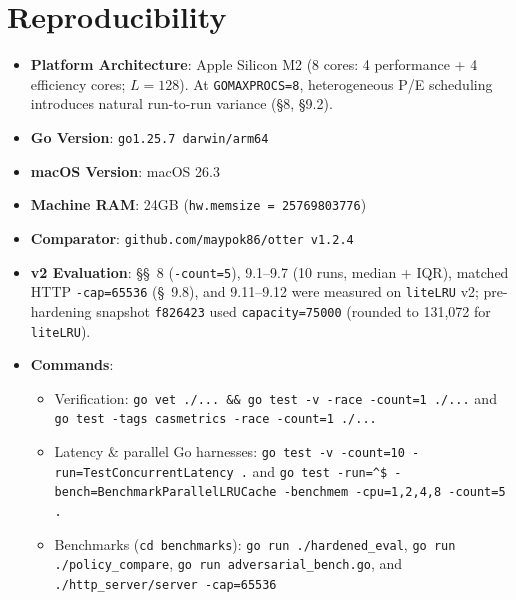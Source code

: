 \documentclass[11pt,a4paper]{article}
\begin{document}
\section{Reproducibility}
\begin{itemize}
    \item \textbf{Platform Architecture}: Apple Silicon M2 (8 cores: 4 performance + 4 efficiency cores; $L=128$). At \texttt{GOMAXPROCS=8}, heterogeneous P/E scheduling introduces natural run-to-run variance (\S 8, \S 9.2).
    \item \textbf{Go Version}: \texttt{go1.25.7 darwin/arm64}
    \item \textbf{macOS Version}: macOS 26.3
    \item \textbf{Machine RAM}: 24GB (\texttt{hw.memsize = 25769803776})
    \item \textbf{Comparator}: \texttt{github.com/maypok86/otter v1.2.4}
    \item \textbf{v2 Evaluation}: \S\S~8 (\texttt{-count=5}), 9.1--9.7 (10 runs, median + IQR), matched HTTP \texttt{-cap=65536} (\S~9.8), and 9.11--9.12 were measured on \texttt{liteLRU} v2; pre-hardening snapshot \texttt{f826423} used \texttt{capacity=75000} (rounded to 131,072 for \texttt{liteLRU}).
    \item \textbf{Commands}:
    \begin{itemize}
        \item Verification: \texttt{go vet ./... \&\& go test -v -race -count=1 ./...} and \texttt{go test -tags casmetrics -race -count=1 ./...}
        \item Latency \& parallel Go harnesses: \texttt{go test -v -count=10 -run=TestConcurrentLatency .} and \texttt{go test -run=\^{}\$ -bench=BenchmarkParallelLRUCache -benchmem -cpu=1,2,4,8 -count=5 .}
        \item Benchmarks (\texttt{cd benchmarks}): \texttt{go run ./hardened\_eval}, \texttt{go run ./policy\_compare}, \texttt{go run adversarial\_bench.go}, and \texttt{./http\_server/server -cap=65536}
    \end{itemize}
\end{itemize}
\end{document}
